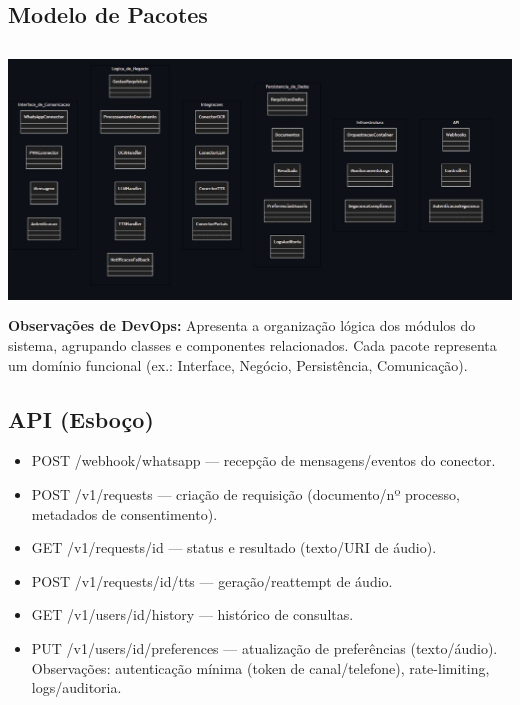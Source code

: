 \documentclass{article}
\begin{document}
\subsection{Modelo de Pacotes}
\includegraphics[width=1.4\textwidth,height=7cm,keepaspectratio]{images/Modelo-de-Pacotes.jpg}
\textbf{Observações de DevOps: } Apresenta a organização lógica dos módulos do sistema, agrupando classes e componentes relacionados. Cada pacote representa um domínio funcional (ex.: Interface, Negócio, Persistência, Comunicação).

\newpage

\subsection{API (Esboço)}
\begin{itemize}
    \item POST /webhook/whatsapp — recepção de mensagens/eventos do conector.
    \item POST /v1/requests — criação de requisição (documento/nº processo, metadados de consentimento).
    \item GET /v1/requests/{id} — status e resultado (texto/URI de áudio).
    \item POST /v1/requests/{id}/tts — geração/reattempt de áudio.
    \item GET /v1/users/{id}/history — histórico de consultas.
    \item PUT /v1/users/{id}/preferences — atualização de preferências (texto/áudio). Observações: autenticação mínima (token de canal/telefone), rate-limiting, logs/auditoria.
\end{itemize}
\end{document}
